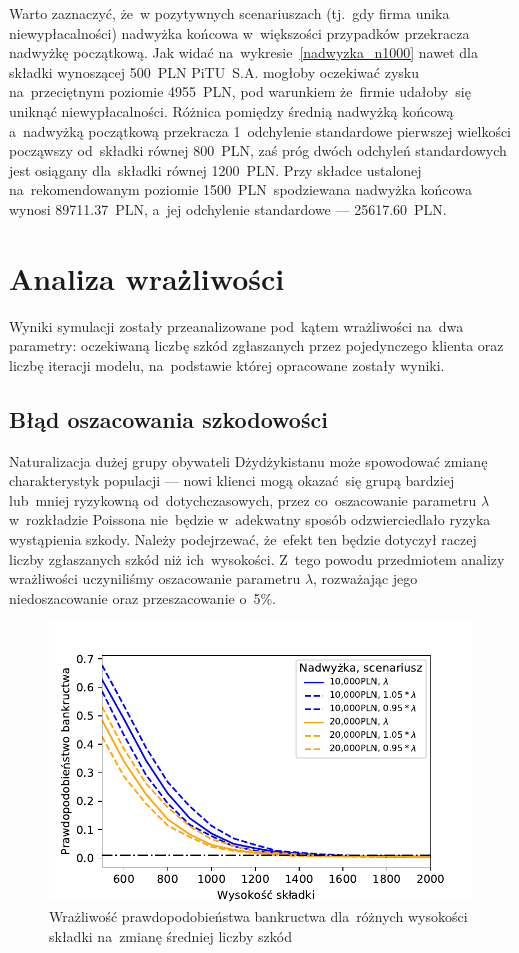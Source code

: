 \documentclass[12pt, a4paper, oneside]{mwart} %
\begin{document}
Warto zaznaczyć, że~w pozytywnych scenariuszach (tj.~gdy firma unika niewypłacalności) nadwyżka końcowa w~większości przypadków przekracza nadwyżkę początkową. Jak widać na~wykresie~\ref{nadwyzka_n1000} nawet dla składki wynoszącej 500~PLN PiTU~S.A. mogłoby oczekiwać zysku na~przeciętnym poziomie 4955~PLN, pod warunkiem że~firmie udałoby~się uniknąć niewypłacalności. Różnica pomiędzy średnią nadwyżką końcową a~nadwyżką początkową przekracza 1~odchylenie standardowe pierwszej wielkości począwszy od~składki równej 800~PLN, zaś próg dwóch odchyleń standardowych jest osiągany dla~składki równej 1200~PLN. Przy składce ustalonej na~rekomendowanym poziomie 1500~PLN~spodziewana nadwyżka końcowa wynosi 89711.37~PLN, a~jej odchylenie standardowe --- 25617.60~PLN.

\section{Analiza wrażliwości}
Wyniki symulacji zostały przeanalizowane pod~kątem wrażliwości na~dwa parametry: oczekiwaną liczbę szkód zgłaszanych przez pojedynczego klienta oraz liczbę iteracji modelu, na~podstawie której opracowane zostały wyniki.

\subsection{Błąd oszacowania szkodowości}
Naturalizacja dużej grupy obywateli Dżydżykistanu może spowodować zmianę charakterystyk populacji --- nowi klienci mogą okazać~się grupą bardziej lub~mniej ryzykowną od~dotychczasowych, przez co~oszacowanie parametru $\lambda$ w~rozkładzie Poissona nie~będzie w~adekwatny sposób odzwierciedlało ryzyka wystąpienia szkody. Należy podejrzewać, że~efekt ten będzie dotyczył raczej liczby zgłaszanych szkód niż ich~wysokości. Z~tego powodu przedmiotem analizy wrażliwości uczyniliśmy oszacowanie parametru $\lambda$, rozważając jego niedoszacowanie oraz przeszacowanie o~5\%.

\begin{figure}
\caption{Wrażliwość prawdopodobieństwa bankructwa dla~różnych wysokości składki na~zmianę średniej liczby szkód}
\label{p_bankructwa_all}
\includegraphics[width = \textwidth]{wykresy/p_bankructwa_all.pdf}
\end{figure}
\end{document}
